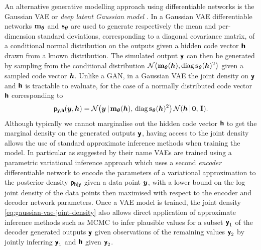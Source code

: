 
An alternative generative modelling approach using differentiable networks is the Gaussian \ac{VAE} \citep{kingma2013auto} or \emph{deep latent Gaussian model} \citep{rezende2014stochastic}. In a Gaussian \ac{VAE} differentiable networks ${\mathbf{m}}_{\boldsymbol{\theta}}$ and ${\mathbf{s}}_{\boldsymbol{\theta}}$ are used to generate respectively the mean and per-dimension standard deviations, corresponding to a diagonal covariance matrix, of a conditional normal distribution on the outputs given a hidden code vector $\boldsymbol{\mathsf{h}}$ drawn from a known distribution. The simulated output $\boldsymbol{\mathsf{y}}$ can then be generated by sampling from the conditional distribution $\nrm{\vctfunc{m}_{\vct{\theta}}(\vct{h}), \diag\vctfunc{s}_{\vct{\theta}}(\vct{h})^2}$ given a sampled code vector $\boldsymbol{h}$. Unlike a \ac{GAN}, in a Gaussian \ac{VAE} the joint density on $\boldsymbol{\mathsf{y}}$ and $\boldsymbol{\mathsf{h}}$ is tractable to evaluate, for the case of a normally distributed code vector $\boldsymbol{\mathsf{h}}$ corresponding to
\begin{equation}\label{eq:gaussian-vae-joint-density}
  \pden{\rvct{y},\rvct{h}}(\vct{y},\vct{h}) = 
  \nrm{\vct{y} \gvn \vctfunc{m}_{\vct{\theta}}(\vct{h}),\, \diag\vctfunc{s}_{\vct{\theta}}(\vct{h})^2}\,
  \nrm{\vct{h} \gvn \vct{0},\,\idmtx}.
\end{equation}
Although typically we cannot marginalise out the hidden code vector $\boldsymbol{\mathsf{h}}$ to get the marginal density on the generated outputs $\boldsymbol{\mathsf{y}}$, having access to the joint density allows the use of standard approximate inference methods when training the model. In particular as suggested by their name \aclp{VAE} are trained using a parametric variational inference approach which uses a second \emph{encoder} differentiable network to encode the parameters of a variational approximation to the posterior density $\mathsf{p}_{\boldsymbol{\mathsf{h}}|\boldsymbol{\mathsf{y}}}$ given a data point $\boldsymbol{y}$, with a lower bound on the log joint density of the data points then maximised with respect to the encoder and decoder network parameters. Once a \ac{VAE} model is trained, the joint density \eqref{eq:gaussian-vae-joint-density} also allows direct application of approximate inference methods such as \acs{MCMC} to infer plausible values for a subset $\boldsymbol{\mathsf{y}}_1$ of the decoder generated outputs $\boldsymbol{\mathsf{y}}$ given observations of the remaining values $\boldsymbol{\mathsf{y}}_2$ by jointly inferring $\boldsymbol{\mathsf{y}}_1$ and $\boldsymbol{\mathsf{h}}$ given $\boldsymbol{\mathsf{y}}_2$.

